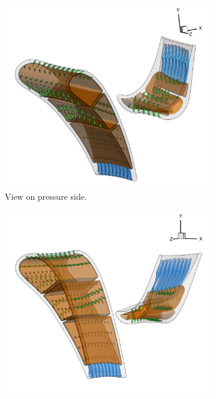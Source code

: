 \documentclass[a4paper, 11pt]{report}
\theoremstyle{definition}
\begin{document}
	\begin{figure}[H]
		\centering
		\begin{subfigure}{.49\textwidth}
			\includegraphics[width=\textwidth]{../tec/complete/60.png}
			\caption{View on pressure side.}
		\end{subfigure}
		\begin{subfigure}{.49\textwidth}
			\includegraphics[width=\textwidth]{../tec/complete/61.png}

\end{subfigure}
\end{figure}
\end{document}
